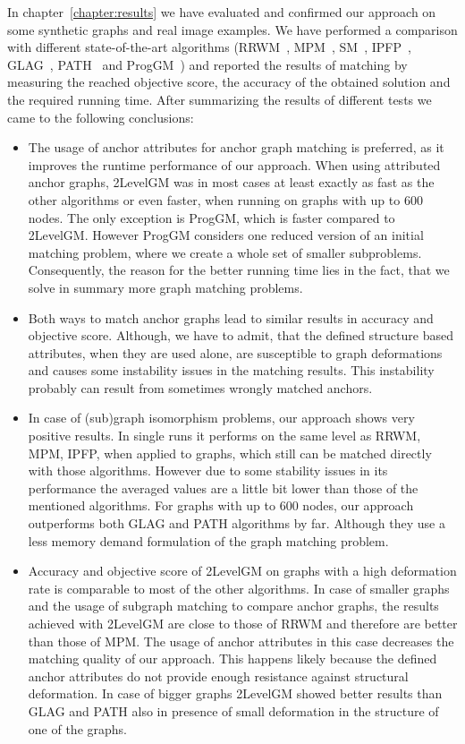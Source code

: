 In chapter~\ref{chapter:results} we have evaluated and confirmed our approach on some synthetic graphs and real image examples. We have performed a comparison with different state-of-the-art algorithms (RRWM~\cite{Cho2010_RRWM}, MPM~\cite{Cho2014_Haystack}, SM~\cite{Leordeanu2005_SM}, IPFP~\cite{Leordeanu2009_IPFP}, GLAG~\cite{Fiori2013_GLAG}, PATH~\cite{Zazlavskiy2008_PATH} and ProgGM~\cite{Cho2012_ProgressiveGM}) and reported the results of matching by measuring the reached objective score, the accuracy of the obtained solution and the required running time. After summarizing the results of different tests we came to the following conclusions:
\begin{itemize}
\item The usage of anchor attributes for anchor graph matching is preferred, as it improves the runtime performance of our approach. 
When using attributed anchor graphs, 2LevelGM was in most cases at least exactly as fast as the other algorithms or even faster, when running on graphs with up to $600$ nodes. The only exception is ProgGM, which is faster compared to 2LevelGM. However ProgGM considers one reduced version of an initial matching problem, where we create a whole set of smaller subproblems. Consequently, the reason for the better running time lies in the fact, that we solve in summary more graph matching problems.
\item Both ways to match anchor graphs lead to similar results in accuracy and objective score. Although, we have to admit, that the defined structure based attributes, when they are used alone, are susceptible to graph deformations and causes some instability issues in the matching results. This instability probably can result from sometimes wrongly matched anchors.
\item In case of (sub)graph isomorphism problems, our approach shows very positive results. In single runs it performs on the same level as RRWM, MPM, IPFP, when applied to graphs, which still can be matched directly with those algorithms. However due to some stability issues in its performance the averaged values are a little bit lower than those of the mentioned algorithms. For graphs with up to $600$ nodes, our approach outperforms both GLAG and PATH algorithms by far. Although they use a less memory demand formulation of the graph matching problem.
\item Accuracy and objective score of 2LevelGM on graphs with a high deformation rate is comparable to most of the other algorithms. In case of smaller graphs and the usage of subgraph matching to compare anchor graphs, the results achieved with 2LevelGM are close to those of RRWM and therefore are better than those of MPM. The usage of anchor attributes in this case decreases the matching quality of our approach.  This happens likely because the defined anchor attributes do not provide enough resistance against structural deformation. In case of bigger graphs 2LevelGM showed better results than GLAG and PATH also in presence of small deformation in the structure of one of the graphs.

\end{itemize}
